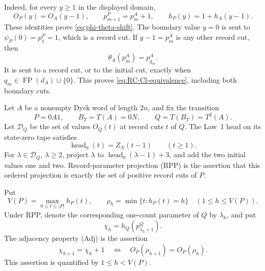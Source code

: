 \documentclass[11pt]{article}
\theoremstyle{definition}
\theoremstyle{remark}
\DeclareMathOperator{\FP}{FP}
\begin{document}
Indeed, for every \(y\geq1\) in the displayed domain,
\[
 O_P(y)=O_A(y-1),
 \qquad
 p^P_{m+1}=p^A_m+1,
 \qquad
 h_P(y)=1+h_A(y-1).
\]
These identities prove \eqref{eq:phi-theta-shift}.  The boundary value
\(y=0\) is sent to \(\psi_P(0)=p^P_1=1\), which is a record cut.  If
\(y-1=p^A_m\) is any other record cut, then
\[
 \theta_A(p^A_m)=p^A_{q_m}.
\]
It is sent to a record cut, or to the initial cut, exactly when
\(q_m\in\FP(d_A)\cup\{0\}\).  This proves
\eqref{eq:RC-Cl-equivalence}, including both boundary cuts.

Let \(A\) be a nonempty Dyck word of length \(2n\), and fix the transition
\begin{equation}
\label{eq:transition-PBQ}
 P=0A1,
 \qquad B_T=T(A)=0N,
 \qquad Q=T(B_T)=T^2(A).
\end{equation}
Let \(\mathcal D_Q\) be the set of values \(O_Q(t)\) at record cuts \(t\) of
\(Q\).  The Law~1 head on its state-zero tape satisfies
\begin{equation}
\label{eq:fast-head}
 \operatorname{head}_0(t)=Z_N(t-1)\qquad(t\geq1).
\end{equation}
For \(\lambda\in\mathcal D_Q\), \(\lambda\geq2\), project \(\lambda\) to
\(\operatorname{head}_0(\lambda-1)+3\), and add the two initial values one
and two.  Record-parameter projection (RPP) is the assertion that this ordered projection is exactly the
set of positive record cuts of \(P\).

Put
\[
 V(P)=\max_{0\leq t\leq|P|}h_P(t),
 \qquad
 \rho_h=\min\{t:h_P(t)=h\}\quad(1\leq h\leq V(P)).
\]
Under RPP, denote the corresponding one-count parameter of \(Q\) by
\(\lambda_h\), and put
\[
 \chi_h=h_Q(p^Q_{\lambda_h+1}).
\]
The adjacency property (Adj) is the assertion
\begin{equation}
\label{eq:Adj}
 \chi_{h+1}=\chi_h+1
 \quad\Longleftrightarrow\quad
 O_P(\rho_{h+1})=O_P(\rho_h).
\end{equation}
This assertion is quantified by \(1\leq h<V(P)\).
\end{document}
